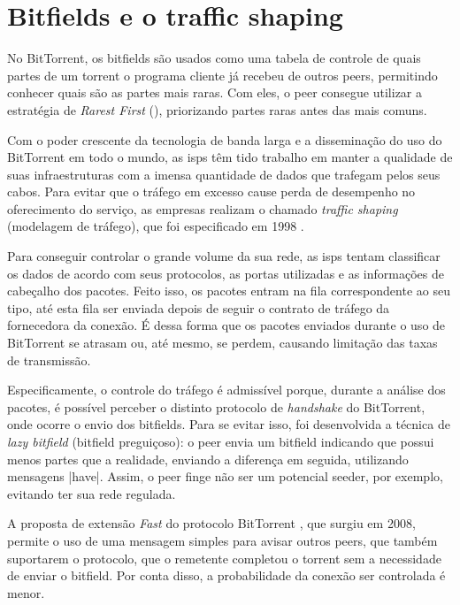 
\newpage
\section{Bitfields e o traffic shaping}
\label{sec:bitfield}

No BitTorrent, os bitfields são usados como uma tabela de controle de quais partes de um
\gls*{torrent} o programa cliente já recebeu de outros \glspl*{peer}, permitindo
conhecer quais são as partes mais raras. Com eles, o \gls*{peer} consegue utilizar a
estratégia de \emph{Rarest First} (\pageref{subsubsec:rarest-first}), priorizando
partes raras antes das mais comuns.

Com o poder crescente da tecnologia de banda larga e a disseminação do uso do
BitTorrent em todo o mundo, as \glspl{isp} têm tido trabalho em manter a qualidade de
suas infraestruturas com a imensa quantidade de dados que trafegam pelos seus cabos.
Para evitar que o tráfego em excesso cause perda de desempenho no oferecimento do
serviço, as empresas realizam o chamado \emph{traffic shaping} (modelagem de tráfego),
que foi especificado em 1998 \cite{site:rfcshaping}.

Para conseguir controlar o grande volume da sua rede, as \glspl*{isp} tentam
classificar os dados de acordo com seus protocolos, as portas utilizadas e as
informações de cabeçalho dos pacotes. Feito isso, os pacotes entram na fila
correspondente ao seu tipo, até esta fila ser enviada depois de seguir o contrato de
tráfego da fornecedora da conexão. É dessa forma que os pacotes enviados durante o uso
de BitTorrent se atrasam ou, até mesmo, se perdem, causando limitação das taxas de
transmissão.

Especificamente, o controle do tráfego é admissível porque, durante a análise dos
pacotes, é possível perceber o distinto protocolo de \emph{handshake} do BitTorrent,
onde ocorre o envio dos bitfields. Para se evitar isso, foi desenvolvida a técnica de
\emph{lazy bitfield} (bitfield preguiçoso): o \gls*{peer} envia um bitfield indicando
que possui menos partes que a realidade, enviando a diferença em seguida, utilizando
mensagens \bverb|have|. Assim, o \gls*{peer} finge não ser um potencial \gls{seeder},
por exemplo, evitando ter sua rede regulada.

A proposta de extensão \emph{Fast} do protocolo BitTorrent \cite{site:bittorrent-fast},
que surgiu em 2008, permite o uso de uma mensagem simples para avisar outros
\glspl*{peer}, que também suportarem o protocolo, que o remetente completou o
\gls*{torrent} sem a necessidade de enviar o bitfield. Por conta disso, a probabilidade
da conexão ser controlada é menor.